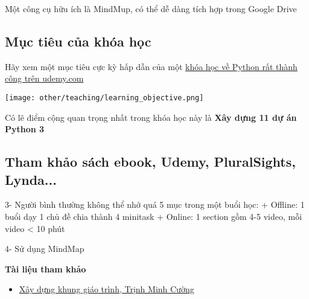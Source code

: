 Một công cụ hữu ích là MindMup, có thể dễ dàng tích hợp trong Google Drive

\subsection{Mục tiêu của khóa học}

Hãy xem một mục tiêu cực kỳ hấp dẫn của một \href{https://www.udemy.com/the-python-bible/}{khóa học về Python rất thành công trên udemy.com}

\texttt{[image: other/teaching/learning\_objective.png]}

Có lẽ điểm cộng quan trọng nhất trong khóa học này là \textbf{Xây dựng 11 dự án Python 3}

\subsection{Tham khảo sách ebook, Udemy, PluralSights, Lynda...}


3- Người bình thường không thể nhớ quá 5 mục trong một buổi học:
+ Offline: 1 buổi dạy 1 chủ đề chia thành 4 minitask
+ Online: 1 section gồm 4-5 video, mỗi video < 10 phút

4- Sử dụng MindMap

\begin{paragraph}
\textbf{Tài liệu tham khảo}

\begin{itemize}
  \item \href{https://techmaster.vn/khoa-hoc-online/25484/tro-thanh-giang-vien-gioi/3263/Xay-dung-khung-giao-trinh}{Xây dựng khung giáo trình, Trịnh Minh Cường}
\end{itemize}
\end{paragraph}
